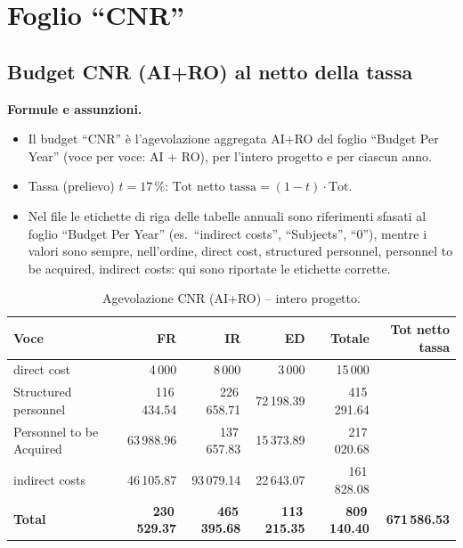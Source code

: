 \documentclass{plan4ari_report}
\begin{document}
\clearpage\section{Foglio ``CNR''}
\subsection{Budget CNR (AI+RO) al netto della tassa}
\textbf{Formule e assunzioni.}
\begin{itemize}
  \item Il budget ``CNR'' \`e l'agevolazione aggregata AI+RO del foglio ``Budget Per Year'' (voce per voce: AI + RO), per l'intero progetto e per ciascun anno.
  \item Tassa (prelievo) $t = 17\,\%$: $\text{Tot netto tassa} = (1-t)\cdot \text{Tot}$.
  \item Nel file le etichette di riga delle tabelle annuali sono riferimenti sfasati al foglio ``Budget Per Year'' (es.\ ``indirect costs'', ``Subjects'', ``0''), mentre i valori sono sempre, nell'ordine, direct cost, structured personnel, personnel to be acquired, indirect costs: qui sono riportate le etichette corrette.
\end{itemize}

\begin{table}[H]\centering\footnotesize\caption{Agevolazione CNR (AI+RO) -- intero progetto.}\label{tab:cnr-tot}
\begin{tabular}{lrrrrr}\toprule\textbf{Voce} & \textbf{FR} & \textbf{IR} & \textbf{ED} & \textbf{Totale} & \textbf{Tot netto tassa} \\\midrule
\quad direct cost & 4\,000 & 8\,000 & 3\,000 & 15\,000 &  \\
\quad Structured personnel & 116\,434.54 & 226\,658.71 & 72\,198.39 & 415\,291.64 &  \\
\quad Personnel to be Acquired & 63\,988.96 & 137\,657.83 & 15\,373.89 & 217\,020.68 &  \\
\quad indirect costs & 46\,105.87 & 93\,079.14 & 22\,643.07 & 161\,828.08 &  \\
\midrule\textbf{Total} & \textbf{230\,529.37} & \textbf{465\,395.68} & \textbf{113\,215.35} & \textbf{809\,140.40} & \textbf{671\,586.53} \\
\bottomrule\end{tabular}\end{table}
\end{document}
